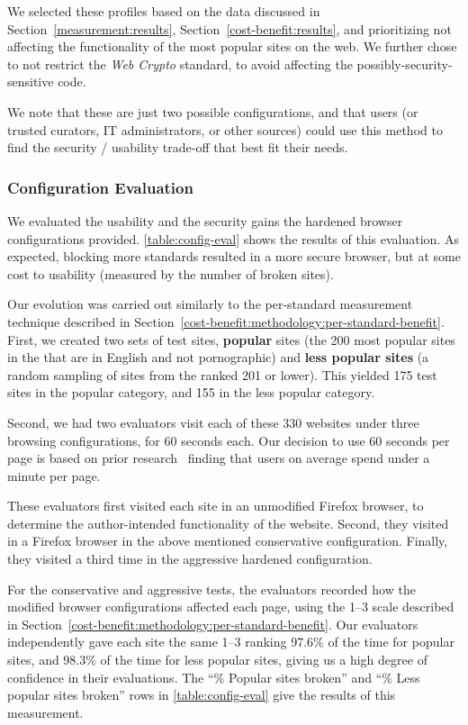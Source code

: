 We selected these profiles based on the data discussed in
Section~\ref{measurement:results}, Section~\ref{cost-benefit:results}, and
prioritizing not affecting the functionality of the most popular sites on the
web.  We further chose to not restrict the \emph{Web Crypto} standard, to avoid
affecting the possibly-security-sensitive code.

We note that these are just two possible configurations, and that users
(or trusted curators, IT administrators, or other sources) could
use this method to find the security / usability trade-off that best fit their needs.


\subsubsection{Configuration Evaluation}
\label{current-web:extension:configuration-evaluations}

We evaluated the usability and the security gains the hardened browser
configurations provided.  \ref{table:config-eval} shows the results of this
evaluation.  As expected, blocking more standards resulted in a more secure
browser, but at some cost to usability (measured by the number of broken
sites).

Our evolution was carried out similarly to the per-standard measurement
technique described in
Section~\ref{cost-benefit:methodology:per-standard-benefit}.  First, we created
two sets of test sites, \textbf{popular} sites (the 200 most popular sites in
the \ATK that are in English and not pornographic) and \textbf{less popular
sites} (a random sampling of sites from the \ATK ranked 201 or lower).
This yielded 175 test sites in the popular category, and 155 in the less
popular category.

Second, we had two evaluators visit each of these 330 websites under three
browsing configurations, for 60 seconds each.  Our decision to use 60 seconds
per page is based on prior research~\cite{liu2010understanding} finding that
users on average spend under a minute per page.

These evaluators first visited each site in an unmodified
Firefox browser, to determine the author-intended functionality of the website.
Second, they visited in a Firefox browser in the above mentioned conservative
configuration.  Finally, they visited a third time in the aggressive hardened
configuration.

For the conservative and aggressive tests, the evaluators recorded how the
modified browser configurations affected each page, using the 1--3 scale
described in Section~\ref{cost-benefit:methodology:per-standard-benefit}.  Our
evaluators independently gave each site the same 1--3 ranking 97.6\% of the
time for popular sites, and 98.3\% of the time for less popular sites, giving
us a high degree of confidence in their evaluations.  The ``\% Popular sites
broken'' and ``\% Less popular sites broken'' rows in \ref{table:config-eval}
give the results of this measurement.

